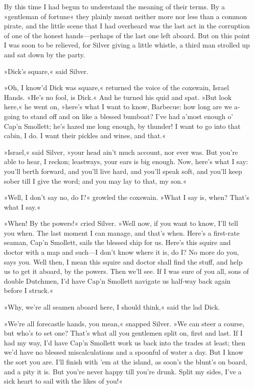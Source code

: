 By this time I had begun to understand the meaning of their terms. By a »gentleman of fortune« they plainly meant neither more nor less than a common pirate, and the little scene that I had overheard was the last act in the corruption of one of the honest hands—perhaps of the last one left aboard. But on this point I was soon to be relieved, for Silver giving a little whistle, a third man strolled up and sat down by the party.

»Dick's square,« said Silver.

»Oh, I know'd Dick was square,« returned the voice of the coxswain, Israel Hands. »He's no fool, is Dick.« And he turned his quid and spat. »But look here,« he went on, »here's what I want to know, Barbecue: how long are we a-going to stand off and on like a blessed bumboat? I've had a'most enough o' Cap'n Smollett; he's hazed me long enough, by thunder! I want to go into that cabin, I do. I want their pickles and wines, and that.«

»Israel,« said Silver, »your head ain't much account, nor ever was. But you're able to hear, I reckon; leastways, your ears is big enough. Now, here's what I say: you'll berth forward, and you'll live hard, and you'll speak soft, and you'll keep sober till I give the word; and you may lay to that, my son.«

»Well, I don't say no, do I?« growled the coxswain. »What I say is, when? That's what I say.«

»When! By the powers!« cried Silver. »Well now, if you want to know, I'll tell you when. The last moment I can manage, and that's when. Here's a first-rate seaman, Cap'n Smollett, sails the blessed ship for us. Here's this squire and doctor with a map and such—I don't know where it is, do I? No more do you, says you. Well then, I mean this squire and doctor shall find the stuff, and help us to get it aboard, by the powers. Then we'll see. If I was sure of you all, sons of double Dutchmen, I'd have Cap'n Smollett navigate us half-way back again before I struck.«

»Why, we're all seamen aboard here, I should think,« said the lad Dick.

»We're all forecastle hands, you mean,« snapped Silver. »We can steer a course, but who's to set one? That's what all you gentlemen split on, first and last. If I had my way, I'd have Cap'n Smollett work us back into the trades at least; then we'd have no blessed miscalculations and a spoonful of water a day. But I know the sort you are. I'll finish with 'em at the island, as soon's the blunt's on board, and a pity it is. But you're never happy till you're drunk. Split my sides, I've a sick heart to sail with the likes of you!«

